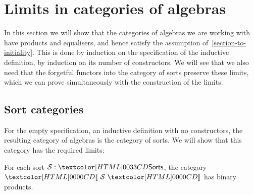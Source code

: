 \section{Limits in categories of algebras}
\label{limits-in-categories-of-algebras}

In this section we will show that the categories of algebras we are
working with have products and equalisers, and hence satisfy the
assumption of~\cref{section-to-initiality}. This is done by induction
on the specification of the inductive definition, \ie by induction on
its number of constructors. We will see that we also need that the
forgetful functors into the category of sorts preserve these limits,
which we can prove simultaneously with the construction of the limits.

\subsection{Sort categories}

For the empty specification, an inductive definition with no
constructors, the resulting category of algebras is the category of
sorts. We will show that this category has the required limits:

\begin{lemma}
  \label{sorts-products}
  For each sort $\Ss : \sortsty$, the category $\SortCat{\Ss}$ has
  binary products.
\end{lemma}

